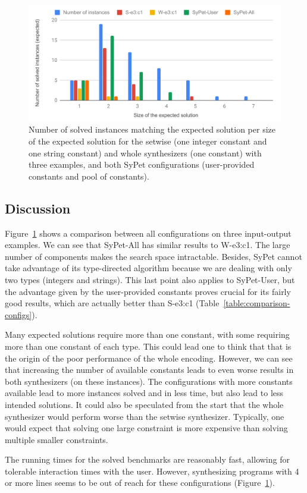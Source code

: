 \begin{figure}
  \centering
  \includegraphics[scale=0.7]{assets/comparison-expected-sypet-small.pdf}
  \caption{Number of solved instances matching the expected solution per size of
    the expected solution for the setwise (one integer constant and one string
    constant) and whole synthesizers (one constant) with three examples, and
    both SyPet configurations (user-provided constants and pool of constants).}
  \label{fig:comparison-expected-sypet}
\end{figure}

\subsection{Discussion}
\label{sec:discussion}

Figure~\ref{fig:comparison-expected-sypet} shows a comparison between all
configurations on three input-output examples.
We can see that SyPet-All has similar results to W-e3:c1.
The large number of components makes the search space intractable.
Besides, SyPet cannot take advantage of its type-directed algorithm because
we are dealing with only two types (integers and strings).
This last point also applies to SyPet-User, but the advantage given by the
user-provided constants proves crucial for its fairly good results, which are
actually better than S-e3:c1 (Table~\ref{table:comparison-configs}).

Many expected solutions require more than one constant, with some requiring more
than one constant of each type.
This could lead one to think that that is the origin of the poor performance of
the whole encoding.
However, we can see that increasing the number of available constants leads to
even worse results in both synthesizers (on these instances).
The configurations with more constants available lead to more instances solved
and in less time, but also lead to less intended solutions.
It could also be speculated from the start that the whole synthesizer would
perform worse than the setwise synthesizer.
Typically, one would expect that solving one large constraint is more expensive
than solving multiple smaller constraints.

The running times for the solved benchmarks are reasonably fast, allowing for
tolerable interaction times with the user.
However, synthesizing programs with 4 or more lines seems to be out of reach for
these configurations (Figure~\ref{fig:comparison-expected-sypet}).
